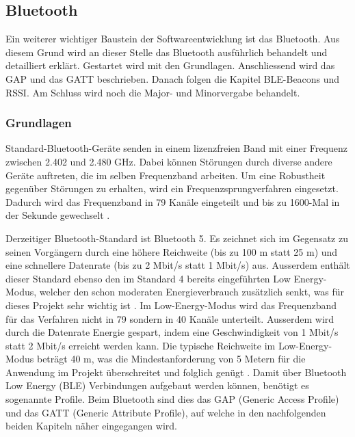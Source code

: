 \subsection{Bluetooth}\label{sec:bluetooth}
Ein weiterer wichtiger Baustein der Softwareentwicklung ist das Bluetooth. Aus diesem Grund wird an dieser Stelle das Bluetooth ausführlich behandelt und detailliert erklärt. Gestartet wird mit den Grundlagen. Anschliessend wird das GAP und das GATT beschrieben. Danach folgen die Kapitel BLE-Beacons und RSSI. Am Schluss wird noch die Major- und Minorvergabe behandelt.
\subsubsection{Grundlagen}
Standard-Bluetooth-Geräte senden in einem lizenzfreien Band mit einer Frequenz zwischen 2.402 und 2.480 GHz. Dabei können Störungen durch diverse andere Geräte auftreten, die im selben Frequenzband arbeiten. Um eine Robustheit gegenüber Störungen zu erhalten, wird ein Frequenzsprungverfahren eingesetzt. Dadurch wird das Frequenzband in 79 Kanäle eingeteilt und bis zu 1600-Mal in der Sekunde gewechselt \cite{5_Teildokument_BT}.

Derzeitiger Bluetooth-Standard ist Bluetooth 5. Es zeichnet sich im Gegensatz zu seinen Vorgängern durch eine höhere Reichweite (bis zu 100 m statt 25 m) und eine schnellere Datenrate (bis zu 2 Mbit/s statt 1 Mbit/s) aus. Ausserdem enthält dieser Standard ebenso den im Standard 4 bereits eingeführten {\glqq Low Energy\grqq}-Modus, welcher den schon moderaten Energieverbrauch zusätzlich senkt, was für dieses Projekt sehr wichtig ist \cite{5_Teildokument_BT}. Im Low-Energy-Modus wird das Frequenzband für das Verfahren nicht in 79 sondern in 40 Kanäle unterteilt. Ausserdem wird durch die Datenrate Energie gespart, indem eine Geschwindigkeit von 1 Mbit/s statt 2 Mbit/s erreicht werden kann. Die typische Reichweite im Low-Energy-Modus beträgt 40 m, was die Mindestanforderung von 5 Metern für die Anwendung im Projekt überschreitet und folglich genügt \cite{6_Teildokument_BT}. Damit über Bluetooth Low Energy (BLE) Verbindungen aufgebaut werden können, benötigt es sogenannte Profile. Beim Bluetooth sind dies das GAP (Generic Access Profile) und das GATT (Generic Attribute Profile), auf welche in den nachfolgenden beiden Kapiteln näher eingegangen wird.

